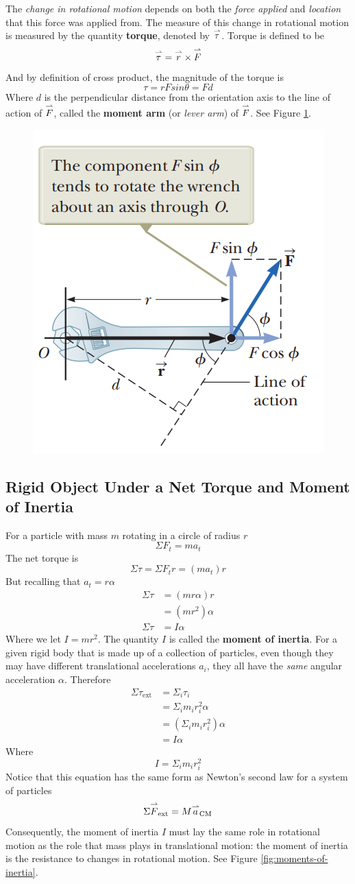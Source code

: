 The \textit{change in rotational motion} depends on both the \textit{force applied} and 
\textit{location} that this force was applied from. The measure of this change in rotational motion
is measured by the quantity \textbf{torque}, denoted by $\overset{\rightharpoonup}{\tau}$. Torque is defined to be
\[
    \overset{\rightharpoonup}{\tau}=\overset{\rightharpoonup}{r}\times\overset{\rightharpoonup}{F}
\]
And by definition of cross product, the magnitude of the torque is
\[
    \tau=rFsin\theta=Fd
\]
Where $d$ is the perpendicular distance from the orientation axis to the line of action of 
$\overset{\rightharpoonup}{F}$, called the \textbf{moment arm} (or \textit{lever arm}) of $\overset{\rightharpoonup}{F}$. See Figure 
\ref{fig:torque}.

\begin{figure}[ht!]
    \centering
    \includegraphics[width=0.4 \textwidth]{../figures/torque.png}
    \caption{}
    \label{fig:torque}
\end{figure}

\subsection{Rigid Object Under a Net Torque and Moment of Inertia}
For a particle with mass $m$ rotating in a circle of radius $r$
\[
    \Sigma F_t=ma_t
\]
The net torque is
\[
    \Sigma\tau=\Sigma F_tr=(ma_t)r
\]
But recalling that $a_t=r\alpha$
\begin{align*}
    \Sigma\tau&=(mr\alpha)r\\
    &=(mr^2)\alpha\\
    \Sigma\tau&=I\alpha
\end{align*}
Where we let $I=mr^2$. The quantity $I$ is called the \textbf{moment of inertia}. For a given rigid
body that is made up of a collection of particles, even though they may have different translational
accelerations $a_i$, they all have the \textit{same} angular acceleration $\alpha$. Therefore
\begin{align*}
    \Sigma \tau_\text{ext}&=\Sigma_i\tau_i\\
    &=\Sigma_im_ir_i^2\alpha\\
    &=(\Sigma_im_ir_i^2)\alpha\\
    &=I\alpha
\end{align*}
Where
\[
    I=\Sigma_im_ir_i^2
\]
Notice that this equation has the same form as Newton's second law for a system of particles
\[
    \Sigma\overset{\rightharpoonup}{F}_\text{ext}=M\overset{\rightharpoonup}{a}_\text{CM}
\]
Consequently, the moment of inertia $I$ must lay the same role in rotational motion as the role
that mass plays in translational motion: the moment of inertia is the resistance to changes in
rotational motion. See Figure \ref{fig:moments-of-inertia}.

